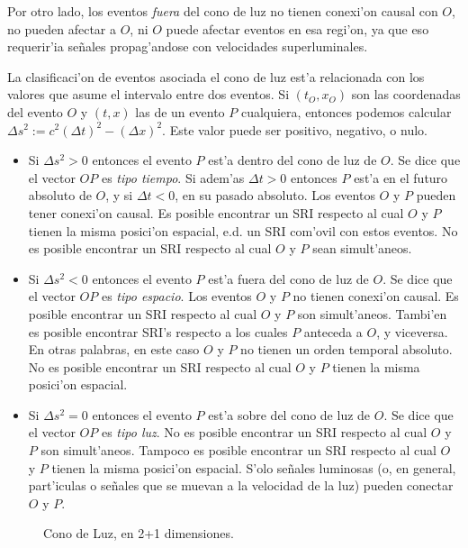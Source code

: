 Por otro lado, los eventos \textit{fuera} del cono de luz no tienen conexi'on causal con $O$, no pueden afectar a $O$, ni $O$ puede afectar eventos en esa regi'on, ya que eso requerir'ia se\~nales propag'andose con velocidades superluminales.

La clasificaci'on de eventos asociada el cono de luz est'a relacionada con los valores que asume el intervalo entre dos eventos. Si $(t_O,x_O)$ son las coordenadas del evento $O$ y $(t,x)$ las de un evento $P$ cualquiera, entonces podemos calcular $\Delta s^2:=c^2(\Delta t)^2-(\Delta x)^2$. Este valor puede ser positivo, negativo, o nulo.
\begin{itemize}
\item Si $\Delta s^2>0$ entonces el evento $P$ est'a dentro del cono de luz de $O$. Se dice que el vector $OP$ es \textit{tipo tiempo}. Si adem'as $\Delta t>0$ entonces $P$ est'a en el futuro absoluto de $O$, y si $\Delta t<0$, en su pasado absoluto. Los eventos $O$ y $P$ pueden tener conexi'on causal. Es posible encontrar un SRI respecto al cual $O$ y $P$ tienen la misma posici'on espacial, e.d. un SRI com'ovil con estos eventos. No es posible encontrar un SRI respecto al cual $O$ y $P$ sean simult'aneos.

\item Si $\Delta s^2<0$ entonces el evento $P$ est'a fuera del cono de luz de $O$. Se dice que el vector $OP$ es \textit{tipo espacio}. Los eventos $O$ y $P$ no tienen conexi'on causal. Es posible encontrar un SRI respecto al cual $O$ y $P$ son simult'aneos. Tambi'en es posible encontrar SRI's respecto a los cuales $P$ anteceda a $O$, y viceversa. En otras palabras, en este caso $O$ y $P$ no tienen un orden temporal absoluto. No es posible encontrar un SRI respecto al cual $O$ y $P$ tienen la misma posici'on espacial.

\item Si $\Delta s^2=0$ entonces el evento $P$ est'a sobre del cono de luz de $O$. Se dice que el vector $OP$ es \textit{tipo luz}. No es posible encontrar un SRI respecto al cual $O$ y $P$ son  simult'aneos. Tampoco es posible encontrar un SRI respecto al cual $O$ y $P$ tienen la misma posici'on espacial. S'olo se\~nales luminosas (o, en general, part'iculas o se\~nales que se muevan a la velocidad de la luz) pueden conectar $O$ y $P$.
\end{itemize}

\begin{figure}[t]
\centering{}\caption{Cono de Luz, en 2+1 dimensiones.}
\end{figure}



